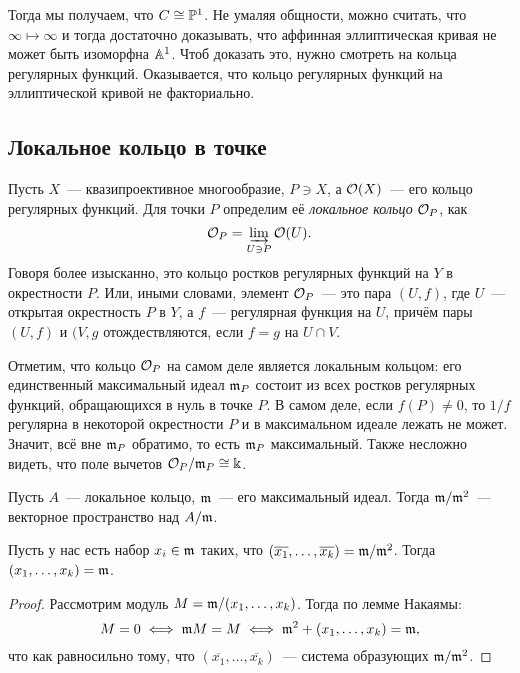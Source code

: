	 Тогда мы получаем, что $C \cong \PP^1$. Не умаляя общности, можно считать, что $\infty \mapsto \infty$ и тогда достаточно доказывать, что аффинная эллиптическая кривая не может быть изоморфна $\AA^1$. Чтоб доказать это, нужно смотреть на кольца регулярных функций. Оказывается, что кольцо регулярных функций на эллиптической кривой не факториально. 

	   

	   \subsection{Локальное кольцо в точке}

	   \begin{definition} 
	   	Пусть $X$~--- квазипроективное многообразие, $P \ni X$, а $\cO(X)$~--- его кольцо регулярных функций. Для точки $P$ определим её \emph{локальное кольцо} $\cO_{P}$, как 
	   	\[
	   		\cO_{P} = \varinjlim_{U \ni P} \cO(U).
	   	\]
	   	Говоря более изысканно, это кольцо ростков регулярных функций на $Y$ в окрестности $P$. Или, иными словами, элемент $\cO_P$~--- это пара $(U, f)$, где $U$~--- открытая окрестность $P$ в $Y$, а $f$~--- регулярная функция на $U$, причём пары $(U, f)$ и $(V, g$ отождествляются, если $f = g$ на $U \cap V$. 
	   \end{definition}

	  Отметим, что кольцо $\cO_P$ на самом деле является локальным кольцом: его единственный максимальный идеал $\fm_P$ состоит из всех ростков регулярных функций, обращающихся в нуль в точке $P$. В самом деле, если $f(P) \neq 0$, то $1/f$ регулярна в некоторой окрестности $P$ и в максимальном идеале лежать не может. Значит, всё вне $\fm_P$ обратимо, то есть $\fm_P$ максимальный. Также несложно видеть, что поле вычетов $\cO_P/\fm_{P} \cong \bk$. 



	   Пусть $A$~--- локальное кольцо, $\fm$~--- его максимальный идеал. Тогда $\fm/\fm^2$~--- векторное пространство над $A/\fm$. 

	   \begin{statement}\label{Nakayama_cor} 
	   		Пусть у нас есть набор $x_i \in \fm$ таких, что $(\overline{x_1}, \ldots, \overline{x_k}) = \fm/\fm^2$. Тогда $(x_1, \ldots, x_k) = \fm$.
	   \end{statement}
	   \begin{proof}
	   		Рассмотрим модуль $M = \fm/(x_1, \ldots, x_k)$. Тогда по лемме Накаямы:
	   \[
	   		M = 0 \iff \fm M = M \iff \fm^2 + (x_1, \ldots, x_k) = \fm,
	   \]
	   что как равносильно тому, что $(\overline{x_1}, \ldots, \overline{x_k})$~--- система образующих $\fm/\fm^2$.
	   \end{proof}


